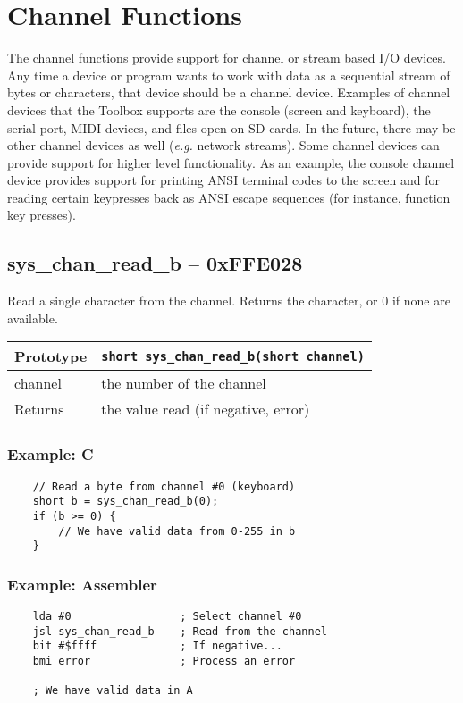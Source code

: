 \section{Channel Functions}
The channel functions provide support for channel or stream based I/O devices.
Any time a device or program wants to work with data as a sequential stream of bytes or characters,
that device should be a channel device.
Examples of channel devices that the Toolbox supports are the console (screen and keyboard), the serial port,
MIDI devices, and files open on SD cards.
In the future, there may be other channel devices as well ({\it e.g.} network streams).
Some channel devices can provide support for higher level functionality.
As an example, the console channel device provides support for printing ANSI terminal codes to the screen
and for reading certain keypresses back as ANSI escape sequences (for instance, function key presses).

\subsection*{sys\_chan\_read\_b -- 0xFFE028}
Read a single character from the channel. Returns the character, or 0 if none are available.

\bigskip

\begin{tabular}{|l||l|} \hline
Prototype & \lstinline!short sys_chan_read_b(short channel)! \\ \hline
channel & the number of the channel \\ \hline
Returns & the value read (if negative, error) \\ \hline
\end{tabular}

\subsubsection*{Example: C}
\begin{lstlisting}
    // Read a byte from channel #0 (keyboard)
    short b = sys_chan_read_b(0);
    if (b >= 0) {
        // We have valid data from 0-255 in b
    }
\end{lstlisting}

\subsubsection*{Example: Assembler}
\begin{verbatim}
    lda #0                 ; Select channel #0
    jsl sys_chan_read_b    ; Read from the channel
    bit #$ffff             ; If negative...
    bmi error              ; Process an error

    ; We have valid data in A
\end{verbatim}

